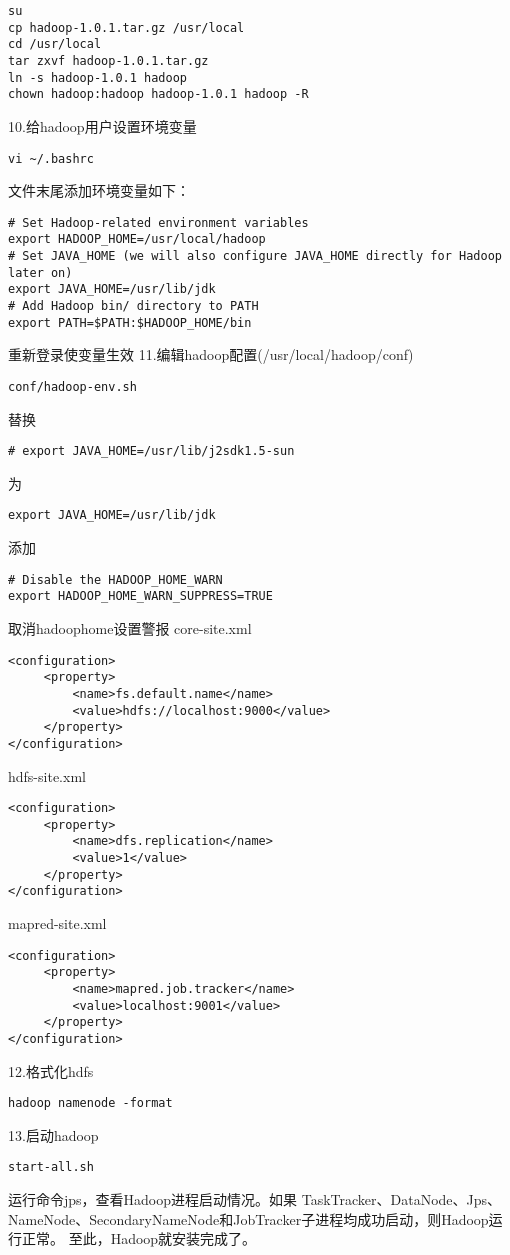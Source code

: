 \begin{verbatim}
su
cp hadoop-1.0.1.tar.gz /usr/local
cd /usr/local
tar zxvf hadoop-1.0.1.tar.gz
ln -s hadoop-1.0.1 hadoop
chown hadoop:hadoop hadoop-1.0.1 hadoop -R
\end{verbatim}
10.给hadoop用户设置环境变量

\begin{verbatim}
vi ~/.bashrc
\end{verbatim}
文件末尾添加环境变量如下：

\begin{verbatim}
# Set Hadoop-related environment variables
export HADOOP_HOME=/usr/local/hadoop
# Set JAVA_HOME (we will also configure JAVA_HOME directly for Hadoop later on)
export JAVA_HOME=/usr/lib/jdk
# Add Hadoop bin/ directory to PATH
export PATH=$PATH:$HADOOP_HOME/bin
\end{verbatim}
重新登录使变量生效
11.编辑hadoop配置(/usr/local/hadoop/conf)

\begin{verbatim}
conf/hadoop-env.sh
\end{verbatim}
替换

\begin{verbatim}
# export JAVA_HOME=/usr/lib/j2sdk1.5-sun
\end{verbatim}
为

\begin{verbatim}
export JAVA_HOME=/usr/lib/jdk
\end{verbatim}
添加

\begin{verbatim}
# Disable the HADOOP_HOME_WARN
export HADOOP_HOME_WARN_SUPPRESS=TRUE
\end{verbatim}
取消hadoophome设置警报
core-site.xml 

\begin{verbatim}
<configuration>
     <property>
         <name>fs.default.name</name>
         <value>hdfs://localhost:9000</value>
     </property>
</configuration>
\end{verbatim}
hdfs-site.xml 

\begin{verbatim}
<configuration>
     <property>
         <name>dfs.replication</name>
         <value>1</value>
     </property>
</configuration>
\end{verbatim}
mapred-site.xml 

\begin{verbatim}
<configuration>
     <property>
         <name>mapred.job.tracker</name>
         <value>localhost:9001</value>
     </property>
</configuration>
\end{verbatim}
12.格式化hdfs

\begin{verbatim}
hadoop namenode -format
\end{verbatim}
13.启动hadoop

\begin{verbatim}
start-all.sh
\end{verbatim}
运行命令jps，查看Hadoop进程启动情况。如果
TaskTracker、DataNode、Jps、NameNode、SecondaryNameNode和JobTracker子进程均成功启动，则Hadoop运行正常。
至此，Hadoop就安装完成了。



